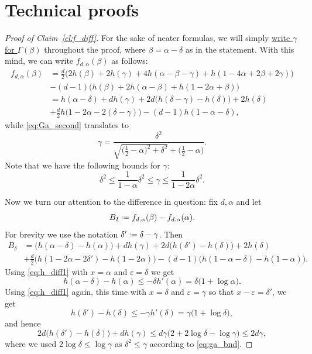 \documentclass[12pt]{amsart}
\theoremstyle{definition}
\newcommand\al{\alpha}
\newcommand\be{\beta}
\newcommand\ga{\gamma}
\newcommand\Ga{\Gamma}
\newcommand\de{\delta}
\newcommand\eps{\varepsilon}
\newcommand{\defeq}{\mathrel{\vcenter{\baselineskip0.5ex \lineskiplimit0pt
                     \hbox{\scriptsize.}\hbox{\scriptsize.}}}%
                     =}
\begin{document}
\section{Technical proofs} \label{sec:technical}

\begin{proof}[Proof of Claim~\ref{cl:f_diff}]
For the sake of neater formulas, we will simply \underline{write $\ga$ for $\Ga(\be)$} throughout the proof, where $\be=\al-\de$ as in the statement. With this mind, we can write $f_{d,\al}(\be)$ as follows:
%
\begin{align*}
f_{d,\al}(\be) 
&= \frac{d}{2} \bigg( 2h(\be)+2h(\ga)
+4 h(\al-\be-\ga) + h(1-4\al+2\be+2\ga) \bigg) \\
&- (d-1) \bigg( h(\be)+ 2h(\al-\be) 
+ h(1-2\al+\be) \bigg) \\
&= h(\al-\de) + d h(\ga) 
+ 2d \bigg( h(\de-\ga) - h(\de) \bigg) + 2h(\de) \\
&+ \frac{d}{2} h\big(1-2\al-2(\de-\ga)\big) 
- (d-1) h(1-\al-\de) ,
\end{align*}  
%
while \eqref{eq:Ga_second} translates to 
%
\begin{equation} \label{eq:ga_bounds}
\ga= \frac{\de^2}{\sqrt{\big(\frac12-\al\big)^2+\de^2}+\big(\frac12-\al\big)} .
\end{equation}
%
Note that we have the following bounds for $\ga$:
%
\begin{equation} \label{eq:ga_bnd}
\de^2 
\leq \frac{1}{1-\al} \de^2
\leq \ga 
\leq \frac{1}{1-2\al} \de^2 .
\end{equation}
%

Now we turn our attention to the difference in question: fix $d,\al$ and let 
%
\begin{equation} \label{eq:B_de}
B_\de \defeq f_{d,\al}(\be)-f_{d,\al}(\al) . 
\end{equation}
%
For brevity we use the notation $\de' \defeq \de-\ga$. Then 
%
\begin{align*}
B_\de 
&= \bigg( h(\al-\de) - h(\al) \bigg) + d h(\ga) 
+ 2d \bigg( h(\de') - h(\de) \bigg) + 2h(\de) \\
&+ \frac{d}{2} \bigg( h(1-2\al-2\de') - h(1-2\al) \bigg)
- (d-1) \bigg( h(1-\al-\de) - h(1-\al) \bigg).
\end{align*}  
%
Using \eqref{eq:h_diff1} with $x=\al$ and $\eps=\de$ we get 
%
\begin{equation} \label{eq:bnd1}
h(\al-\de) - h(\al) \leq -\de h'(\al) 
= \de \big( 1+\log \al \big) .
\end{equation}
%
Using \eqref{eq:h_diff1} again, this time with $x=\de$ and $\eps=\ga$ so that $x-\eps=\de'$, we get 
%
\[ h(\de') - h(\de) \leq -\ga h'(\de) 
= \ga \big( 1+ \log \de \big) ,\]
%
and hence 
%
\begin{equation} \label{eq:bnd2}
2d\bigg( h(\de') - h(\de) \bigg) + d h(\ga) 
\leq d \ga \big(2 + 2 \log \de  - \log \ga \big) 
\leq 2d \ga ,
\end{equation}
%
where we used $2 \log \de \leq \log \ga$ as $\de^2 \leq \ga$ according to \eqref{eq:ga_bnd}. 



\end{proof}
\end{document}
